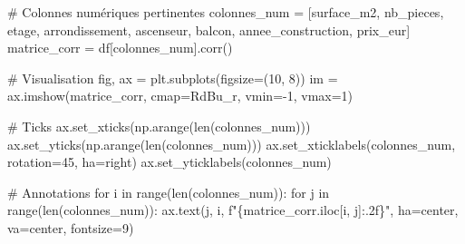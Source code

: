 \documentclass[
  french,
  11pt,
  a4paper,
]{scrbook}
\newenvironment{Shaded}{}{}
\newcommand{\BuiltInTok}[1]{\textcolor[rgb]{0.84,0.23,0.29}{#1}}
\newcommand{\CommentTok}[1]{\textcolor[rgb]{0.42,0.45,0.49}{#1}}
\newcommand{\ControlFlowTok}[1]{\textcolor[rgb]{0.84,0.23,0.29}{#1}}
\newcommand{\DecValTok}[1]{\textcolor[rgb]{0.00,0.36,0.77}{#1}}
\newcommand{\KeywordTok}[1]{\textcolor[rgb]{0.84,0.23,0.29}{#1}}
\newcommand{\NormalTok}[1]{\textcolor[rgb]{0.14,0.16,0.18}{#1}}
\newcommand{\OperatorTok}[1]{\textcolor[rgb]{0.14,0.16,0.18}{#1}}
\newcommand{\SpecialCharTok}[1]{\textcolor[rgb]{0.00,0.36,0.77}{#1}}
\newcommand{\SpecialStringTok}[1]{\textcolor[rgb]{0.01,0.18,0.38}{#1}}
\newcommand{\StringTok}[1]{\textcolor[rgb]{0.01,0.18,0.38}{#1}}
\begin{document}
\begin{tcolorbox}[enhanced jigsaw, arc=.35mm, bottomrule=.15mm, bottomtitle=1mm, breakable, colback=white, colbacktitle=quarto-callout-tip-color!10!white, colframe=quarto-callout-tip-color-frame, coltitle=black, left=2mm, leftrule=.75mm, opacityback=0, opacitybacktitle=0.6, rightrule=.15mm, title=\textcolor{quarto-callout-tip-color}{\faLightbulb}\hspace{0.5em}{✅ Corrigé Étape 1.3}, titlerule=0mm, toprule=.15mm, toptitle=1mm]

\begin{Shaded}
\begin{Highlighting}[]
\CommentTok{\# Colonnes numériques pertinentes}
\NormalTok{colonnes\_num }\OperatorTok{=}\NormalTok{ [}\StringTok{\textquotesingle{}surface\_m2\textquotesingle{}}\NormalTok{, }\StringTok{\textquotesingle{}nb\_pieces\textquotesingle{}}\NormalTok{, }\StringTok{\textquotesingle{}etage\textquotesingle{}}\NormalTok{, }\StringTok{\textquotesingle{}arrondissement\textquotesingle{}}\NormalTok{,}
                \StringTok{\textquotesingle{}ascenseur\textquotesingle{}}\NormalTok{, }\StringTok{\textquotesingle{}balcon\textquotesingle{}}\NormalTok{, }\StringTok{\textquotesingle{}annee\_construction\textquotesingle{}}\NormalTok{, }\StringTok{\textquotesingle{}prix\_eur\textquotesingle{}}\NormalTok{]}
\NormalTok{matrice\_corr }\OperatorTok{=}\NormalTok{ df[colonnes\_num].corr()}

\CommentTok{\# Visualisation}
\NormalTok{fig, ax }\OperatorTok{=}\NormalTok{ plt.subplots(figsize}\OperatorTok{=}\NormalTok{(}\DecValTok{10}\NormalTok{, }\DecValTok{8}\NormalTok{))}
\NormalTok{im }\OperatorTok{=}\NormalTok{ ax.imshow(matrice\_corr, cmap}\OperatorTok{=}\StringTok{\textquotesingle{}RdBu\_r\textquotesingle{}}\NormalTok{, vmin}\OperatorTok{={-}}\DecValTok{1}\NormalTok{, vmax}\OperatorTok{=}\DecValTok{1}\NormalTok{)}

\CommentTok{\# Ticks}
\NormalTok{ax.set\_xticks(np.arange(}\BuiltInTok{len}\NormalTok{(colonnes\_num)))}
\NormalTok{ax.set\_yticks(np.arange(}\BuiltInTok{len}\NormalTok{(colonnes\_num)))}
\NormalTok{ax.set\_xticklabels(colonnes\_num, rotation}\OperatorTok{=}\DecValTok{45}\NormalTok{, ha}\OperatorTok{=}\StringTok{\textquotesingle{}right\textquotesingle{}}\NormalTok{)}
\NormalTok{ax.set\_yticklabels(colonnes\_num)}

\CommentTok{\# Annotations}
\ControlFlowTok{for}\NormalTok{ i }\KeywordTok{in} \BuiltInTok{range}\NormalTok{(}\BuiltInTok{len}\NormalTok{(colonnes\_num)):}
    \ControlFlowTok{for}\NormalTok{ j }\KeywordTok{in} \BuiltInTok{range}\NormalTok{(}\BuiltInTok{len}\NormalTok{(colonnes\_num)):}
\NormalTok{        ax.text(j, i, }\SpecialStringTok{f"}\SpecialCharTok{\{}\NormalTok{matrice\_corr}\SpecialCharTok{.}\NormalTok{iloc[i, j]}\SpecialCharTok{:.2f\}}\SpecialStringTok{"}\NormalTok{, }
\NormalTok{                ha}\OperatorTok{=}\StringTok{\textquotesingle{}center\textquotesingle{}}\NormalTok{, va}\OperatorTok{=}\StringTok{\textquotesingle{}center\textquotesingle{}}\NormalTok{, fontsize}\OperatorTok{=}\DecValTok{9}\NormalTok{)}


\end{Highlighting}
\end{Shaded}
\end{tcolorbox}
\end{document}
